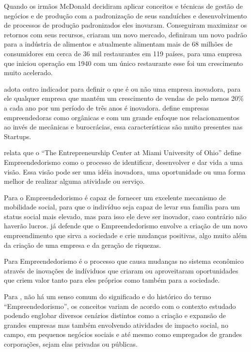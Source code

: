 Quando os irmãos McDonald decidiram aplicar conceitos e técnicas de gestão de negócios e de produção com a padronização de seus sanduíches e desenvolvimento de processos de produção padronizados eles inovaram. Conseguiram maximizar os retornos com seus recursos, criaram um novo mercado, definiram um novo padrão para a indústria de alimentos e atualmente alimentam mais de 68 milhões de consumidores em cerca de 36 mil restaurantes em 119 países, para uma empresa que iniciou operação em 1940 com um único restaurante esse foi um crescimento muito acelerado. 

 adota outro indicador para definir o que é ou não uma empresa inovadora, para ele qualquer empresa que mantém um crescimento de vendas de pelo menos 20\% a cada ano por um período de três anos é inovadora.  define empresas empreendedoras como orgânicas e com um grande enfoque nos relacionamentos ao invés de mecânicas e burocrácias, essa características são muito presentes nas Startups.

 relata que o ``The Entrepreneurship Center at Miami University of Ohio'' define Empreendedorismo como o processo de identificar, desenvolver e dar vida a uma visão. Essa visão pode ser uma idéia inovadora, uma oportunidade ou uma forma melhor de realizar alguma atividade ou serviço.

Para  o Empreendedorismo é capaz de fornecer um excelente mecanismo de mobilidade social, para que o indivíduo seja capaz de levar sua família para um status social mais elevado, mas para isso ele deve ser inovador, caso contrário não haverão lucros.  já defende que o Empreendedorismo envolve a criação de um novo empreendimento que sirva a sociedade e crie mudanças positivas, algo muito além da criação de uma empresa e da geração de riquezas. 

Para  Empreendedorismo é o processo que causa mudanças no sistema econômico através de inovações de indíviduos que criaram ou aproveitaram oportunidades que criem valor tanto para eles próprios como também para a sociedade.

Para , não há um senso comum do significado e do histórico do termo ``Empreendedorismo'', os conceitos variam de acordo com o contexto estudado podendo englobar diversos cenários distintos como a criação e expansão de grandes empresas mas também envolvendo atividades de impacto social, no campo, em pequenos negócios sociais e até mesmo como empregados de grandes corporações, sejam elas privadas ou públicas. 

